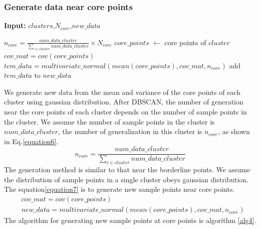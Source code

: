 \documentclass[runningheads]{llncs}
\begin{document}
\subsubsection{Generate data near core points}
\begin{algorithm}[tb]
  \caption{$generate\_core$}
  \label{alg4}
  \hspace*{0.02in} {\bf Input:} $clusters$,$N_{core}$,$new\_data$
  \begin{algorithmic}
    \State $n_{core}=\frac{num\_data\_cluster}{\sum_{i \in cluster} num\_data\_cluster} \times N_{core}$
    \State $core\_points$ $\leftarrow$ core points of $cluster$
    \State $cov\_mat=cov(core\_points)$
    \State $tem\_data=multivariate\_normal(mean(core\_points),cov\_mat,n_{core})$
    \State add $tem\_data$ to $new\_data$
  \EndFor
  \end{algorithmic}
\end{algorithm}
We generate new data from the mean and variance of the 
core points of each cluster using gaussian distribution.
After DBSCAN, 
the number of generation near the core points of each cluster depends 
on the number of sample points in the cluster.
We assume the number of sample points in the cluster is $num\_data\_cluster$, 
 the number of generalization in this cluster is $n_{core}$, as shown in Eq.\ref{equation6}.
 \begin{equation}
  \label{equation6}
  n_{core}=\frac{num\_data\_cluster}{\sum_{i \in cluster} num\_data\_cluster}
\end{equation}
The generation method is similar to that near the borderline points. 
We assume the distribution of sample points in a single cluster obeys gaussian distribution.
The equation\ref{equation7} is to generate new sample points near core points.
\begin{equation}
  \label{equation7}
  \begin{aligned}
    & cov\_mat=cov(core\_points) \\
    & new\_data=multivariate\_normal(mean(core\_points),cov\_mat,n_{core})
  \end{aligned}
\end{equation}
The algorithm for generating new sample points at core points is algorithm \ref{alg4}.

\end{document}
